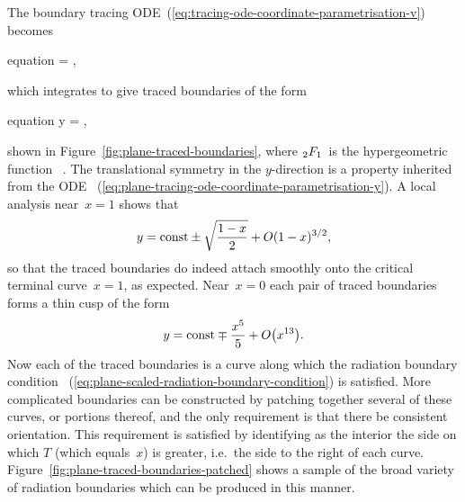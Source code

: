 \begin{figure}
\end{figure}

The boundary tracing ODE~(\ref{eq:tracing-ode-coordinate-parametrisation-v})
becomes
\begin{important}{equation}
   = \mp {},
  \label{eq:plane-tracing-ode-coordinate-parametrisation-y}
\end{important}
which integrates to give traced boundaries of the form
\begin{important}{equation}
  y =
  \const
    \mp
  \hypergeo {},
  \label{eq:plane-traced-boundary}
\end{important}
shown in Figure~\ref{fig:plane-traced-boundaries},
where $\mathop{}\!{_2F_1}$~is the hypergeometric function~%
\cite[Chapter~15]{olver-2010-nist-handbook-mathematical-functions}.
The translational symmetry in the $y$-direction
is a property inherited from the ODE~%
  (\ref{eq:plane-tracing-ode-coordinate-parametrisation-y}).
A local analysis near~$x = 1$ shows that
\begin{equation}
  y = \mathrm{const} \pm \sqrt{\frac{1 - x}{2}} + \mathop{}\! O (1 - x)^{3/2},
  \label{eq:plane-traced-boundary-x-near-1}
\end{equation}
so that the traced boundaries do indeed attach smoothly
onto the critical terminal curve~$x = 1$, as expected.
Near~$x = 0$ each pair of traced boundaries forms a thin cusp of the form
\begin{equation}
  y = \const \mp \frac{x^5}{5} + \order \roundbr*{x^{13}}.
  \label{eq:plane-traced-boundary-x-near-0}
\end{equation}
Now each of the traced boundaries is a curve along which
the radiation boundary condition~%
  (\ref{eq:plane-scaled-radiation-boundary-condition})
is satisfied.
More complicated boundaries can be constructed
by patching together several of these curves, or portions thereof,
and the only requirement is that there be consistent orientation.
This requirement is satisfied by identifying as the interior
the side on which $T$ (which equals~$x$) is greater,
i.e.~the side to the right of each curve.
Figure~\ref{fig:plane-traced-boundaries-patched} shows
a sample of the broad variety of radiation boundaries
which can be produced in this manner.

\begin{figure}
\end{figure}

